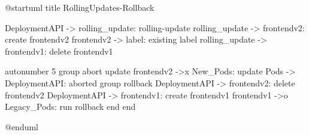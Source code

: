 @startuml
title RollingUpdates-Rollback

DeploymentAPI -> rolling_update: rolling-update
rolling_update -> frontendv2: create frontendv2
frontendv2 -> label: existing label
rolling_update -> frontendv1: delete frontendv1

autonumber 5
group abort update
  frontendv2 ->x New_Pods: update
  Pods -> DeploymentAPI: aborted
  group rollback
    DeploymentAPI -> frontendv2: delete frontendv2
    DeploymentAPI -> frontendv1: create frontendv1
    frontendv1 ->o Legacy_Pods: run rollback
    end
end

@enduml
